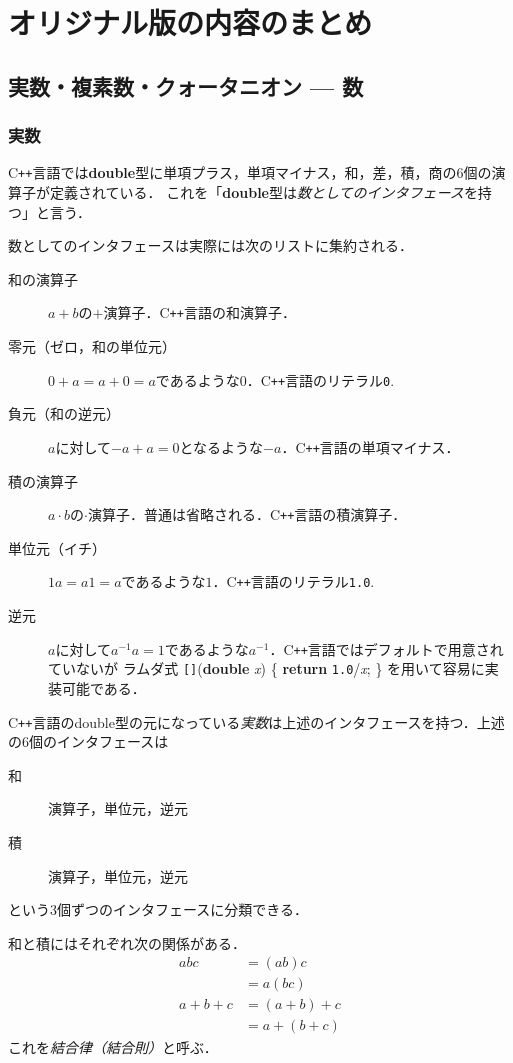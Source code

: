 \documentclass{jsbook}
\newcommand{\cxx}{\textrm{C}\texttt{++}}
\newcommand{\cliteral}[1]{\texttt{#1}}
\newcommand{\ckeyword}[1]{\textbf{#1}}
\newcommand{\cid}[1]{\textit{#1}}
\newcommand{\keyword}[1]{\emph{#1}}
\begin{document}
\chapter{オリジナル版の内容のまとめ}

\section{実数・複素数・クォータニオン --- 数}

\subsection{実数}

\cxx 言語では\ckeyword{double}型に単項プラス，単項マイナス，和，差，積，商の6個の演算子が定義されている．
これを「\ckeyword{double}型は\keyword{数としてのインタフェース}を持つ」と言う．

数としてのインタフェースは実際には次のリストに集約される．
\begin{description}
\item[和の演算子] $a+b$の$+$演算子．\cxx 言語の和演算子．
\item[零元（ゼロ，和の単位元）] $0+a=a+0=a$であるような$0$．\cxx 言語のリテラル\cliteral{0}.
\item[負元（和の逆元）] $a$に対して$-a+a=0$となるような$-a$．\cxx 言語の単項マイナス．
\item[積の演算子] $a\cdot b$の$\cdot$演算子．普通は省略される．\cxx 言語の積演算子．
\item[単位元（イチ）] $1a=a1=a$であるような$1$．\cxx 言語のリテラル\cliteral{1.0}.
\item[逆元] $a$に対して$a^{-1}a=1$であるような$a^{-1}$．\cxx 言語ではデフォルトで用意されていないが
ラムダ式 \texttt{[]}(\ckeyword{double} \cid{x}) \{ \ckeyword{return} \cliteral{1.0}/\cid{x}; \} を用いて容易に実装可能である．
\end{description}
\cxx 言語のdouble型の元になっている\keyword{実数}は上述のインタフェースを持つ．上述の6個のインタフェースは
\begin{description}
\item[和] 演算子，単位元，逆元
\item[積] 演算子，単位元，逆元
\end{description}
という3個ずつのインタフェースに分類できる．

和と積にはそれぞれ次の関係がある．
\begin{align}
abc&=(ab)c\\
  &=a(bc)\\
a+b+c&=(a+b)+c\\
  &=a+(b+c)
\end{align}
これを\keyword{結合律（結合則）}と呼ぶ．
\end{document}
